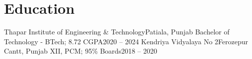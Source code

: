 \section{Education}
\resumeSubHeadingListStart
  \resumeSubheading
    {Thapar Institute of Engineering \& Technology}{Patiala, Punjab}
    {Bachelor of Technology - BTech; 8.72 CGPA}{2020 -- 2024}
  \resumeSubheading
    {Kendriya Vidyalaya No 2}{Ferozepur Cantt, Punjab}
    {XII, PCM;  95\% Boards}{2018 -- 2020}
\resumeSubHeadingListEnd